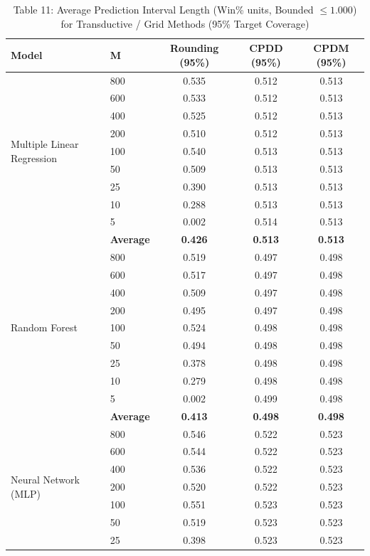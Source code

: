 \documentclass[11pt,a4paper]{article}
\begin{document}
\begin{table}[H]
\centering
\caption{Table 11: Average Prediction Interval Length (Win\% units, Bounded $\le 1.000$) for Transductive / Grid Methods (95\% Target Coverage)}
\label{tab:team_tab11}
\scriptsize
\begin{tabular}{llccc}
\toprule
Model & M & Rounding (95\%) & CPDD (95\%) & CPDM (95\%) \\
\midrule
\multirow{9}{*}{Multiple Linear Regression}
 & 800 & 0.535 & 0.512 & 0.513 \\
 & 600 & 0.533 & 0.512 & 0.513 \\
 & 400 & 0.525 & 0.512 & 0.513 \\
 & 200 & 0.510 & 0.512 & 0.513 \\
 & 100 & 0.540 & 0.513 & 0.513 \\
 & 50  & 0.509 & 0.513 & 0.513 \\
 & 25  & 0.390 & 0.513 & 0.513 \\
 & 10  & 0.288 & 0.513 & 0.513 \\
 & 5   & 0.002 & 0.514 & 0.513 \\
 & \textbf{Average} & \textbf{0.426} & \textbf{0.513} & \textbf{0.513} \\
\midrule
\multirow{9}{*}{Random Forest}
 & 800 & 0.519 & 0.497 & 0.498 \\
 & 600 & 0.517 & 0.497 & 0.498 \\
 & 400 & 0.509 & 0.497 & 0.498 \\
 & 200 & 0.495 & 0.497 & 0.498 \\
 & 100 & 0.524 & 0.498 & 0.498 \\
 & 50  & 0.494 & 0.498 & 0.498 \\
 & 25  & 0.378 & 0.498 & 0.498 \\
 & 10  & 0.279 & 0.498 & 0.498 \\
 & 5   & 0.002 & 0.499 & 0.498 \\
 & \textbf{Average} & \textbf{0.413} & \textbf{0.498} & \textbf{0.498} \\
\midrule
\multirow{9}{*}{Neural Network (MLP)}
 & 800 & 0.546 & 0.522 & 0.523 \\
 & 600 & 0.544 & 0.522 & 0.523 \\
 & 400 & 0.536 & 0.522 & 0.523 \\
 & 200 & 0.520 & 0.522 & 0.523 \\
 & 100 & 0.551 & 0.523 & 0.523 \\
 & 50  & 0.519 & 0.523 & 0.523 \\
 & 25  & 0.398 & 0.523 & 0.523 \\

\end{tabular}
\end{table}
\end{document}
